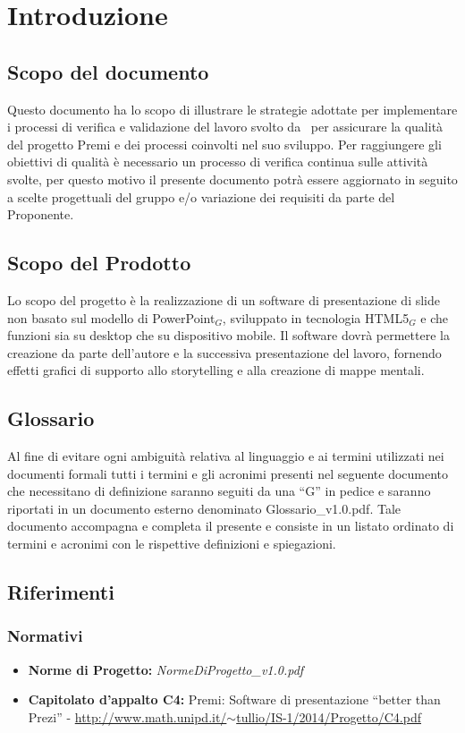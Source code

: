 \section{Introduzione}

\subsection{Scopo del documento}
Questo documento ha lo scopo di illustrare le strategie adottate per implementare i processi di verifica e validazione del lavoro svolto da \gruppo\ per assicurare la qualità del progetto Premi e dei processi coinvolti nel suo sviluppo. Per raggiungere gli obiettivi di qualità è necessario un processo di verifica continua sulle attività svolte, per questo motivo il presente documento potrà essere aggiornato in seguito a scelte progettuali del gruppo e/o variazione dei requisiti da parte del Proponente.

\subsection{Scopo del Prodotto}
Lo scopo del progetto è la realizzazione di un software di presentazione di slide non basato sul modello di PowerPoint$_{G}$, sviluppato in tecnologia HTML5$_{G}$ e che funzioni sia su desktop che su dispositivo mobile. Il software dovrà permettere la creazione da parte dell'autore e la successiva presentazione del lavoro, fornendo effetti grafici di supporto allo storytelling e alla creazione di mappe mentali.

\subsection{Glossario}
Al fine di evitare ogni ambiguità relativa al linguaggio e ai termini utilizzati nei documenti formali tutti i termini e gli acronimi presenti nel seguente documento che necessitano di definizione saranno seguiti da una ``G'' in pedice e saranno riportati in un documento esterno denominato Glossario\_v1.0.pdf. Tale documento accompagna e completa il presente e consiste in un listato ordinato di termini e acronimi con le rispettive definizioni e spiegazioni.

\subsection{Riferimenti}
\subsubsection{Normativi}
\begin{itemize}
	\item \textbf{Norme di Progetto:} \textit{NormeDiProgetto\_v1.0.pdf}
	\item \textbf{Capitolato d'appalto C4:} Premi: Software di presentazione ``better than Prezi'' - \href{http://www.math.unipd.it/~tullio/IS-1/2014/Progetto/C4.pdf}{http://www.math.unipd.it/$\sim$tullio/IS-1/2014/Progetto/C4.pdf}
\end{itemize}
